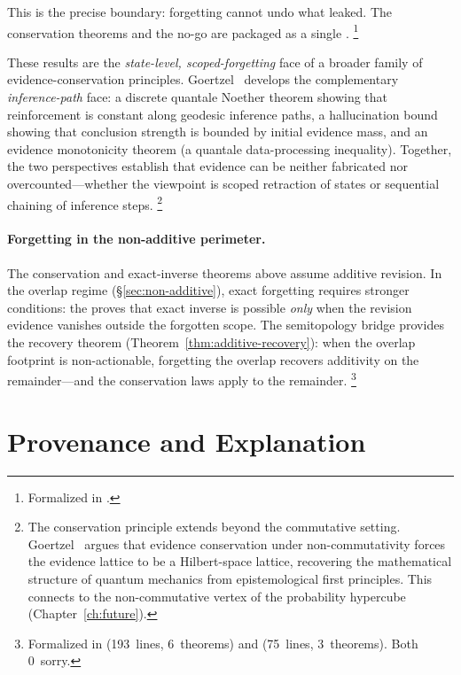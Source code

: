 \documentclass[11pt,openany]{report}
\begin{document}
\noindent
This is the precise boundary: forgetting cannot undo what leaked.
The conservation theorems and the no-go are packaged as a single
.%
\footnote{Formalized in
.}

These results are the \emph{state-level, scoped-forgetting} face of
a broader family of evidence-conservation principles.
Goertzel~\cite{GoertzelEvidenceConservation2026} develops the
complementary \emph{inference-path} face: a discrete quantale Noether
theorem showing that reinforcement is constant along geodesic
inference paths, a hallucination bound showing that conclusion
strength is bounded by initial evidence mass, and an evidence
monotonicity theorem (a quantale data-processing inequality).
Together, the two perspectives establish that evidence can be neither
fabricated nor overcounted---whether the viewpoint is scoped
retraction of states or sequential chaining of inference steps.%
\footnote{The conservation principle extends beyond the commutative
setting.  Goertzel~\cite{GoertzelQMEvidence2026} argues that
evidence conservation under non-commutativity forces the evidence
lattice to be a Hilbert-space lattice, recovering the mathematical
structure of quantum mechanics from epistemological first principles.
This connects to the non-commutative vertex of the probability
hypercube (Chapter~\ref{ch:future}).}

\paragraph{Forgetting in the non-additive perimeter.}
The conservation and exact-inverse theorems above assume additive
revision.  In the overlap regime
(\S\ref{sec:non-additive}), exact forgetting requires stronger
conditions: the  proves that
exact inverse is possible \emph{only} when the revision evidence
vanishes outside the forgotten scope.  The semitopology bridge
provides the recovery theorem
(Theorem~\ref{thm:additive-recovery}): when the overlap footprint
is non-actionable, forgetting the overlap recovers additivity on
the remainder---and the conservation laws apply to the
remainder.%
\footnote{Formalized in
(193~lines, 6~theorems) and
(75~lines, 3~theorems).  Both 0~sorry.}


\section{Provenance and Explanation}
\label{sec:provenance}
\end{document}
